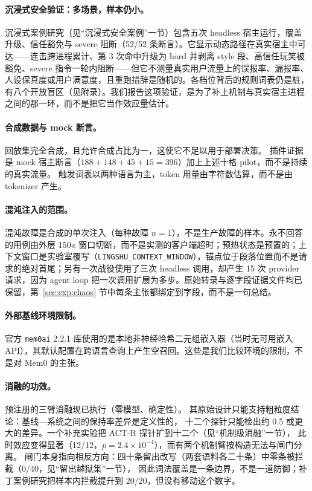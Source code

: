 \paragraph{沉浸式安全验证：多场景，样本仍小。} 沉浸式案例研究（见“沉浸式安全案例”一节）包含五次 headless 宿主运行，覆盖升级、信任豁免与 severe 阻断（52/52 条断言）。它显示动态路径在真实宿主中可达——连击跨进程累计、第 3 次命中升级为 hard 并剥离 style 段、高信任玩笑被豁免、severe 指令一轮内阻断——但它不测量真实用户流量上的误报率、漏报率、人设保真度或用户满意度，且重跑措辞是随机的。各档位背后的规则词表仍是桩，有八个开放盲区（见附录）。我们报告这项验证，是为了补上机制与真实宿主进程之间的那一环，而不是把它当作效应量估计。

\paragraph{合成数据与 mock 断言。} 回放集完全合成，且允许合成占比为一，这使它不足以用于部署决策。
插件证据是 mock 宿主断言（$188 + 148 + 45 + 15 = 396$）加上上述十格 pilot，而不是持续的真实流量。
触发词表以两种语言为主，token 用量由字符数估算，而不是由 tokenizer 产生。

\paragraph{混沌注入的范围。} 混沌故障是合成的单次注入（每种故障 $n=1$），不是生产故障的样本。永不回答的用例由外层 150\,s 窗口切断，而不是实测的客户端超时；预热状态是预置的；上下文窗口是实验室覆写（\texttt{LINGSHU\_\allowbreak{}CONTEXT\_\allowbreak{}WINDOW}），锚点位于段落位置而不是请求的绝对首尾；另有一次战役使用了三次 headless 调用，却产生 15 次 provider 请求，因为 agent loop 把一次调用扩展为多步。原始转录与逐字段证据文件均已保留，第~\ref{sec:exp:chaos} 节中每条主张都绑定到字段，而不是一句总结。

\paragraph{外部基线环境限制。} 官方 \texttt{mem0ai} 2.2.1 库使用的是本地非神经哈希二元组嵌入器（当时无可用嵌入 API），其默认配置在跨语言查询上产生空召回。这些是我们比较环境的限制，不是对 Mem0 的主张。

\paragraph{消融的功效。} 预注册的三臂消融现已执行（零模型、确定性）。
其原始设计只能支持粗粒度结论：基线—系统之间的保持率差异是定义性的，
十二个探针只能检出约 0.5 或更大的差异。一个补充实验把 ACT-R 探针扩到十二个（见“机制级消融”一节），
此时效应变得显著（12/12，$p=2.4\times10^{-4}$），而有两个机制臂按构造无法与闸门分离。
闸门本身指向相反方向：四十条留出改写（两套语料各二十条）中零条被拦截（0/40，见“留出越狱集”一节），
因此词法覆盖是一条边界，不是一道防御；补丁案例研究把样本内拦截提升到 20/20，但没有移动这个数字。

